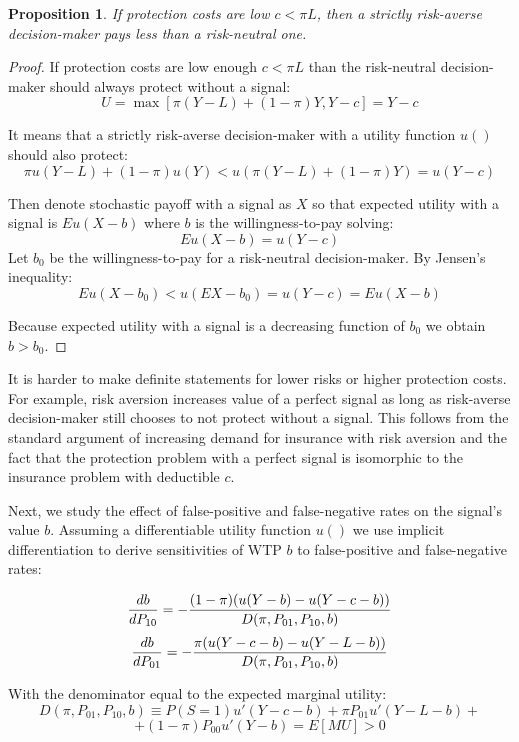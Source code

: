 \documentclass[12pt,a4paper]{article}
\newtheorem{theorem}{Proposition}
\begin{document}
\begin{theorem}
 If protection costs are low $c<\pi L$, then a strictly risk-averse decision-maker pays less than a risk-neutral one.
\end{theorem} 
\small
\begin{proof} If protection costs are low enough $c<\pi L$ than the risk-neutral decision-maker should always protect without a signal:
$$U=\max[\pi(Y-L)+(1-\pi)Y,Y-c]=Y-c$$

It means that a strictly risk-averse decision-maker with a utility function $u()$ should also protect:
$$\pi u(Y-L)+(1-\pi)u(Y)<u(\pi(Y-L)+(1-\pi)Y)=u(Y-c)$$

Then denote stochastic payoff with a signal as $X$ so that expected utility with a signal is $Eu(X-b)$ where $b$ is the willingness-to-pay solving:
$$Eu(X-b)=u(Y-c)$$
 Let $b_0$ be the willingness-to-pay for a risk-neutral decision-maker. By Jensen's inequality:
$$Eu(X-b_0)<u(EX-b_0)=u(Y-c)=Eu(X-b)$$

Because expected utility with a signal is a decreasing function of $b_0$ we obtain $b>b_0$. \end{proof} \normalsize
It is harder to make definite statements for lower risks or higher protection costs. For example, risk aversion increases value of a perfect signal as long as risk-averse decision-maker still chooses to not protect without a signal. This follows from the standard argument of increasing demand for insurance with risk aversion and the fact that the protection problem with a perfect signal is isomorphic to the insurance problem with deductible $c$. 

Next, we study the effect of false-positive and false-negative rates on the signal's value $b$. Assuming a differentiable utility function $u()$ we use implicit differentiation to derive sensitivities of WTP $b$ to false-positive and false-negative rates:

$${db\over dP_{10}}=-{(1-\pi)(u(Y-b)-u(Y-c-b))\over D(\pi, P_{01}, P_{10}, b)}$$
$${db\over dP_{01}}=-{\pi(u(Y-c-b)-u(Y-L-b))\over D(\pi, P_{01}, P_{10}, b)}$$

With the denominator equal to the expected marginal utility:
$$D(\pi, P_{01}, P_{10}, b)\equiv P(S=1)u'(Y-c-b)+\pi P_{01}u'(Y-L-b)+$$
$$+(1-\pi)P_{00}u'(Y-b)=E[MU]>0$$
\end{document}
